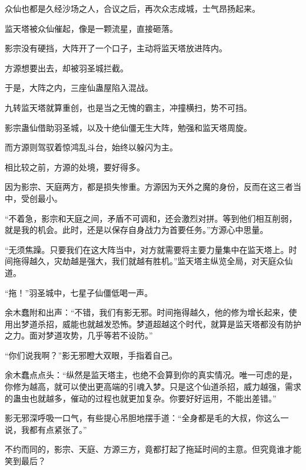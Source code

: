\begin{this_body}
众仙也都是久经沙场之人，合议之后，再次众志成城，士气昂扬起来。

监天塔被众仙催起，像是一颗流星，直接砸落。

影宗没有硬挡，大阵开了一个口子，主动将监天塔放进阵内。

方源想要出去，却被羽圣城拦截。

于是，大阵之内，三座仙蛊屋陷入混战。

九转监天塔就算重创，也是当之无愧的霸主，冲撞横扫，势不可挡。

影宗蛊仙借助羽圣城，以及十绝仙僵无生大阵，勉强和监天塔周旋。

而方源则驾驭着惊鸿乱斗台，始终以躲闪为主。

相比较之前，方源的处境，要好得多。

因为影宗、天庭两方，都是损失惨重。方源因为天外之魔的身份，反而在这三者当中，受创最小。

“不着急，影宗和天庭之间，矛盾不可调和，还会激烈对拼。等到他们相互削弱，就是我的机会。此时，还是以保存自身战力为首要任务。”方源心中思量。

“无须焦躁。只要我们在这大阵当中，对方就需要将主要力量集中在监天塔上。时间拖得越久，灾劫越是强大，我们就越有胜机。”监天塔主纵览全局，对天庭众仙道。

“拖！”羽圣城中，七星子仙僵低喝一声。

余木蠢附和出声：“不错，我们有影无邪。时间拖得越久，他的修为增长起来，使用出梦道杀招，威能也就越发恐怖。梦道超越这个时代，就算是监天塔都没有防护之力。面对梦道攻势，几乎等若不设防。”

“你们说我啊？”影无邪瞪大双眼，手指着自己。

余木蠢点点头：“纵然是监天塔主，也绝不会算到你的真实情况。唯一可虑的是，你修为越高，就可以使出更高端的引魂入梦。只是这个仙道杀招，威力越强，需求的蛊虫也就越多，催动的过程也就更加复杂。你要好好运用，不能出差错。”

影无邪深呼吸一口气，有些提心吊胆地摆手道：“全身都是毛的大叔，你这么一说，我都有点紧张了。”

不约而同的，影宗、天庭、方源三方，竟都打起了拖延时间的主意。但究竟谁才能笑到最后？

\end{this_body}

